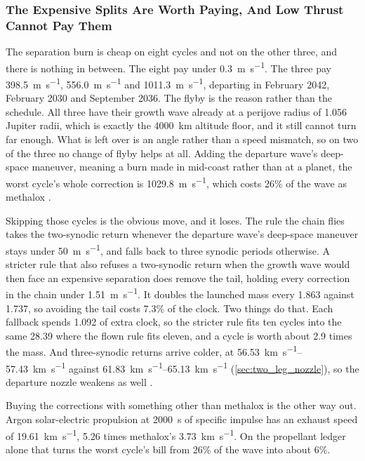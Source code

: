 \documentclass{article}
\begin{document}
\subsubsection{The Expensive Splits Are Worth Paying, And Low Thrust Cannot Pay Them}\label{sec:split_tail}
The separation burn is cheap on eight cycles and not on the other three, and there is nothing in between. The eight pay under \SI{0.3}{\meter\per\second}. The three pay \SI{398.5}{\meter\per\second}, \SI{556.0}{\meter\per\second} and \SI{1011.3}{\meter\per\second}, departing in February 2042, February 2030 and September 2036. The flyby is the reason rather than the schedule. All three have their growth wave already at a perijove radius of \num{1.056} Jupiter radii, which is exactly the \SI{4000}{\kilo\meter} altitude floor, and it still cannot turn far enough. What is left over is an angle rather than a speed mismatch, so on two of the three no change of flyby helps at all. Adding the departure wave's deep-space maneuver, meaning a burn made in mid-coast rather than at a planet, the worst cycle's whole correction is \SI{1029.8}{\meter\per\second}, which costs 26\% of the wave as methalox \cite{Katz_aim_is_all_you_need_2025}.

Skipping those cycles is the obvious move, and it loses. The rule the chain flies takes the two-synodic return whenever the departure wave's deep-space maneuver stays under \SI{50}{\meter\per\second}, and falls back to three synodic periods otherwise. A stricter rule that also refuses a two-synodic return when the growth wave would then face an expensive separation does remove the tail, holding every correction in the chain under \SI{1.51}{\meter\per\second}. It doubles the launched mass every \SI{1.863}{\year} against \SI{1.737}{\year}, so avoiding the tail costs 7.3\% of the clock. Two things do that. Each fallback spends \SI{1.092}{\year} of extra clock, so the stricter rule fits ten cycles into the same \SI{28.39}{\year} where the flown rule fits eleven, and a cycle is worth about \num{2.9} times the mass. And three-synodic returns arrive colder, at \SIrange{56.53}{57.43}{\kilo\meter\per\second} against \SIrange{61.83}{65.13}{\kilo\meter\per\second} (\autoref{sec:two_leg_nozzle}), so the departure nozzle weakens as well \cite{Katz_aim_is_all_you_need_2025}.

Buying the corrections with something other than methalox is the other way out. Argon solar-electric propulsion at \SI{2000}{\second} of specific impulse has an exhaust speed of \SI{19.61}{\kilo\meter\per\second}, \num{5.26} times methalox's \SI{3.73}{\kilo\meter\per\second}. On the propellant ledger alone that turns the worst cycle's bill from 26\% of the wave into about 6\%.
\end{document}
